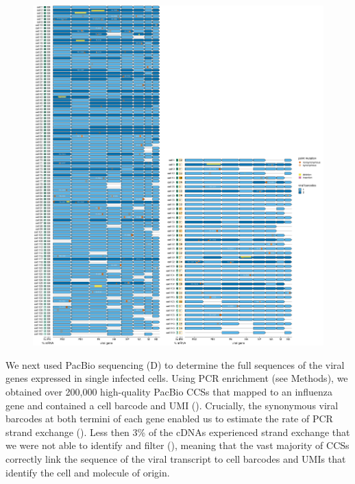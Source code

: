 \documentclass[9pt,lineno]{elife}
\begin{document}
\begin{figure}
\begin{fullwidth}
{\includegraphics[width=\textwidth]{figures/single_cell_figures/p_genotypes_by_ifn.pdf}}
\label{figsupp:genotypes_by_ifn}

\label{figdata:primer_sequences}

\label{figdata:genotypes}

\end{fullwidth}
\end{figure}

We next used PacBio sequencing (D) to determine the full sequences of the viral genes expressed in single infected cells.
Using PCR enrichment (see Methods), we obtained over 200,000 high-quality PacBio CCSs that mapped to an influenza gene and contained a cell barcode and UMI ().
Crucially, the synonymous viral barcodes at both termini of each gene enabled us to estimate the rate of PCR strand exchange ().
Less then 3\% of the cDNAs experienced strand exchange that we were not able to identify and filter (), meaning that the vast majority of CCSs correctly link the sequence of the viral transcript to cell barcodes and UMIs that identify the cell and molecule of origin.
\end{document}
